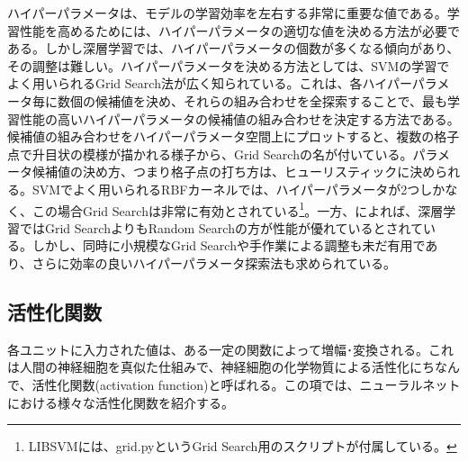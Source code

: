 ハイパーパラメータは、モデルの学習効率を左右する非常に重要な値である。学習性能を高めるためには、ハイパーパラメータの適切な値を決める方法が必要である。しかし深層学習では、ハイパーパラメータの個数が多くなる傾向があり、その調整は難しい。ハイパーパラメータを決める方法としては、SVMの学習でよく用いられるGrid Search法が広く知られている\cite{hsu2003a-practical}。これは、各ハイパーパラメータ毎に数個の候補値を決め、それらの組み合わせを全探索することで、最も学習性能の高いハイパーパラメータの候補値の組み合わせを決定する方法である。候補値の組み合わせをハイパーパラメータ空間上にプロットすると、複数の格子点で升目状の模様が描かれる様子から、Grid Searchの名が付いている。パラメータ候補値の決め方、つまり格子点の打ち方は、ヒューリスティックに決められる。SVMでよく用いられるRBFカーネルでは、ハイパーパラメータが2つしかなく、この場合Grid Searchは非常に有効とされている\footnote{LIBSVMには、grid.pyというGrid Search用のスクリプトが付属している。}。一方、\cite{bengio2012practical}によれば、深層学習ではGrid SearchよりもRandom Searchの方が性能が優れているとされている。しかし、同時に小規模なGrid Searchや手作業による調整も未だ有用であり、さらに効率の良いハイパーパラメータ探索法も求められている。

\subsection{活性化関数}
各ユニットに入力された値は、ある一定の関数によって増幅･変換される。これは人間の神経細胞を真似た仕組みで、神経細胞の化学物質による活性化にちなんで、活性化関数(activation function)と呼ばれる。この項では、ニューラルネットにおける様々な活性化関数を紹介する。
